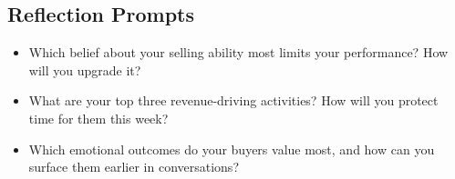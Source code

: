 \subsection*{Reflection Prompts}
\begin{itemize}
    \item Which belief about your selling ability most limits your performance? How will you upgrade it?
    \item What are your top three revenue-driving activities? How will you protect time for them this week?
    \item Which emotional outcomes do your buyers value most, and how can you surface them earlier in conversations?
\end{itemize}